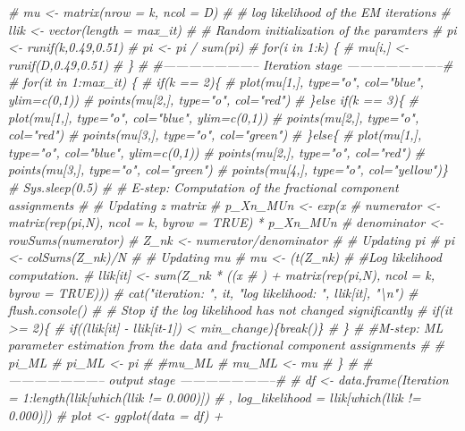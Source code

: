 \documentclass[]{article}
\newenvironment{Shaded}{\begin{snugshade}}{\end{snugshade}}
\newcommand{\CommentTok}[1]{\textcolor[rgb]{0.56,0.35,0.01}{\textit{#1}}}
\begin{document}
\begin{Shaded}
\begin{Highlighting}[]
\CommentTok{# mu <- matrix(nrow = k, ncol = D)}
\CommentTok{# # log likelihood of the EM iterations}
\CommentTok{# llik <- vector(length = max_it)}
\CommentTok{# # Random initialization of the paramters}
\CommentTok{# pi <- runif(k,0.49,0.51)}
\CommentTok{# pi <- pi / sum(pi)}
\CommentTok{# for(i in 1:k) \{}
\CommentTok{# mu[i,] <- runif(D,0.49,0.51)}
\CommentTok{# \}}
\CommentTok{# #----------------------- Iteration stage -----------------------#}
\CommentTok{# for(it in 1:max_it) \{}
\CommentTok{# if(k == 2)\{}
\CommentTok{# plot(mu[1,], type="o", col="blue", ylim=c(0,1))}
\CommentTok{# points(mu[2,], type="o", col="red")}
\CommentTok{# \}else if(k == 3)\{}
\CommentTok{# plot(mu[1,], type="o", col="blue", ylim=c(0,1))}
\CommentTok{# points(mu[2,], type="o", col="red")}
\CommentTok{# points(mu[3,], type="o", col="green")}
\CommentTok{# \}else\{}
\CommentTok{# plot(mu[1,], type="o", col="blue", ylim=c(0,1))}
\CommentTok{# points(mu[2,], type="o", col="red")}
\CommentTok{# points(mu[3,], type="o", col="green")}
\CommentTok{# points(mu[4,], type="o", col="yellow")\}}
\CommentTok{# Sys.sleep(0.5)}
\CommentTok{# # E-step: Computation of the fractional component assignments}
\CommentTok{# # Updating z matrix}
\CommentTok{# p_Xn_MUn <- exp(x %*% log(t(mu)) + (1 - x) %*% log(1 - t(mu)))}
\CommentTok{# numerator <- matrix(rep(pi,N), ncol = k, byrow = TRUE) * p_Xn_MUn}
\CommentTok{# denominator <- rowSums(numerator)}
\CommentTok{# Z_nk <- numerator/denominator}
\CommentTok{# # Updating pi}
\CommentTok{# pi <- colSums(Z_nk)/N}
\CommentTok{# # Updating mu}
\CommentTok{# mu <- (t(Z_nk) %*% x)/colSums(Z_nk)}
\CommentTok{# #Log likelihood computation.}
\CommentTok{# llik[it] <- sum(Z_nk * ((x %*% log(t(mu)) + (1 - x) %*% log(1 - t(mu))}
\CommentTok{# ) + matrix(rep(pi,N), ncol = k, byrow = TRUE)))}
\CommentTok{# cat("iteration: ", it, "log likelihood: ", llik[it], "\textbackslash{}n")}
\CommentTok{# flush.console()}
\CommentTok{# # Stop if the log likelihood has not changed significantly}
\CommentTok{# if(it >= 2)\{}
\CommentTok{# if((llik[it] - llik[it-1]) < min_change)\{break()\}}
\CommentTok{# \}}
\CommentTok{# #M-step: ML parameter estimation from the data and fractional component assignments}
\CommentTok{# # pi_ML}
\CommentTok{# pi_ML <- pi}
\CommentTok{# #mu_ML}
\CommentTok{# mu_ML <- mu}
\CommentTok{# \}}
\CommentTok{# #----------------------- output stage -----------------------#}
\CommentTok{# df <- data.frame(Iteration = 1:length(llik[which(llik != 0.000)])}
\CommentTok{# , log_likelihood = llik[which(llik != 0.000)])}
\CommentTok{# plot <- ggplot(data = df) +}
}}}
\end{Highlighting}
\end{Shaded}
\end{document}
